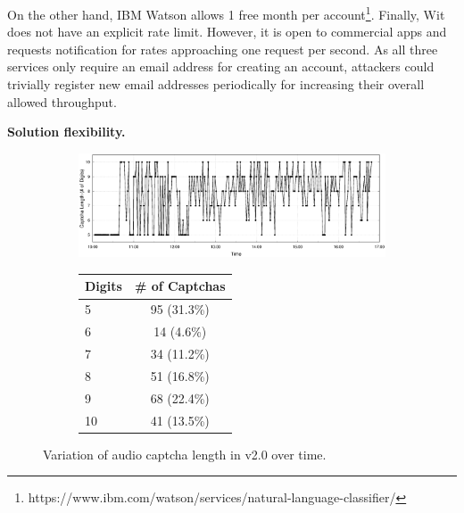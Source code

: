 On the other hand, IBM Watson allows 1 free month per account\footnote{https://www.ibm.com/watson/services/natural-language-classifier/}.
Finally, Wit does not have an explicit rate limit. However, it is open to commercial
apps and requests notification for rates approaching one request per second. As all three services
only require an email address for creating an account, attackers could trivially register 
new email addresses periodically for increasing their overall allowed throughput.



\textbf{Solution flexibility.} 

\begin{figure}[t]
\begin{subfigure}{0.75\textwidth}
    \centering
    \includegraphics[width=1\textwidth]{figures/captcha_length.eps}
    \label{fig:length_time}
\end{subfigure} %
\begin{subfigure}{0.2\textwidth}
    \centering
    \label{tab:length}
    \begin{tabular}{lc}
    \toprule
    \textbf{Digits} & \textbf{\# of Captchas} \\
    \hline
    5 & 95 (31.3\%) \\
    \rowcolor{Gray} 
    6 & 14 (4.6\%) \\
    7 & 34 (11.2\%) \\
    \rowcolor{Gray} 
    8 & 51 (16.8\%) \\
    9 & 68 (22.4\%) \\
    \rowcolor{Gray} 
    10 & 41 (13.5\%)\\
    \bottomrule
    \end{tabular}
\end{subfigure}
\caption{Variation of audio captcha length in \re v2.0 over time.}
\label{fig:length}
\end{figure}

